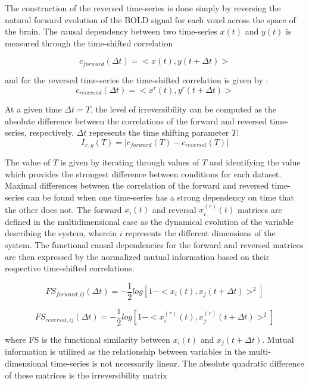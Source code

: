 The construction of the reversed time-series is done simply by reversing
the natural forward evolution of the BOLD signal for each voxel across
the space of the brain. The causal dependency between two time-series
\(x(t)\) and \(y(t)\) is measured through the time-shifted correlation

\begin{equation}
c_{forward}(\Delta t) = <x(t),y(t+\Delta t)>
\end{equation}
 
and for the reversed time-series the time-shifted correlation is
given by \parencite{Deco2022, Kringelbach2023}: 
\begin{equation}
c_{reversed}(\Delta t) = <x^{r}(t),y^{r}(t+\Delta t)>
\end{equation}

At a given time \(\Delta t = T\), the level of irreversibility can be
computed as the absolute difference between the correlations of the forward and reversed time-series, respectively. \(\Delta t\)
represents the time shifting parameter \(T\):
\begin{equation}
I_{x,y}(T) = |c_{forward}(T) - c_{reversal}(T)|
\end{equation}

The value of \(T\) is given by iterating through
values of \(T\) and identifying the value which provides the strongest
difference between conditions for each dataset. Maximal differences between the
correlation of the forward and reversed time-series can be found when
one time-series has a strong dependency on time that the other does not.
The forward \(x_i(t)\) and reversal \(x^{(r)}_i(t)\) matrices are
defined in the multidimensional case as the dynamical evolution of the variable describing the
system, wherein \(i\) represents the different dimensions of the system.
The functional causal dependencies for the forward and reversed matrices
are then expressed by the normalized mutual information based on their
respective time-shifted correlations:


\begin{equation}
FS_{forward,ij}(\Delta t) = -\frac{1}{2}log[1-<x_i(t),x_j(t+\Delta t)>^2]
\end{equation}

\begin{equation}
FS_{reversal,ij}(\Delta t) = -\frac{1}{2}log[1-<x_i^{(r)}(t),x_j^{(r)}(t+\Delta t)>^2]
\end{equation}


where FS is the functional similarity between $x_i(t)$ and $x_j(t+\Delta t)$. Mutual information is utilized as the relationship between variables in
the multi-dimensional time-series is not necessarily linear. The
absolute quadratic difference of these matrices is the irreversibility
matrix


